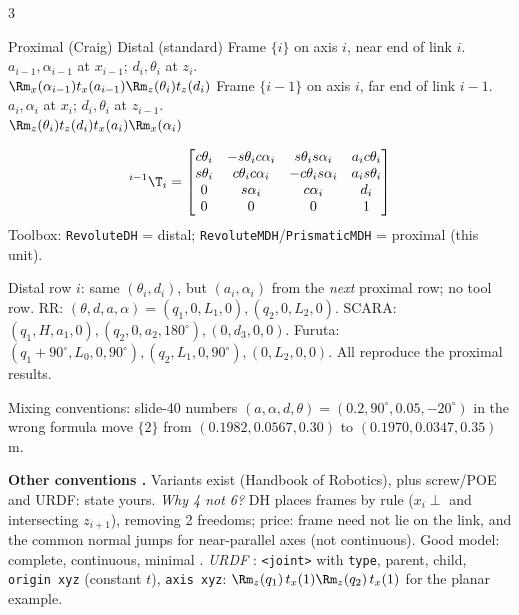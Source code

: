 \begin{multicols}{3}
\begin{twoway}{Proximal (Craig) }{Distal (standard) }
Frame $\{i\}$ on axis $i$, near end of link $i$.\\ $a_{i-1},\alpha_{i-1}$ at $x_{i-1}$; $d_i,\theta_i$ at $z_i$.\\
$\Rm_x(\alpha_{i-1})t_x(a_{i-1})\Rm_z(\theta_i)t_z(d_i)$
\tcblower
Frame $\{i{-}1\}$ on axis $i$, far end of link $i{-}1$.\\ $a_i,\alpha_i$ at $x_i$; $d_i,\theta_i$ at $z_{i-1}$.\\
$\Rm_z(\theta_i)t_z(d_i)t_x(a_i)\Rm_x(\alpha_i)$
\end{twoway}
\begin{fbx}
\[{}^{i-1}\T_i=\begin{bmatrix}c\theta_i&-s\theta_i c\alpha_i&s\theta_i s\alpha_i&a_ic\theta_i\\s\theta_i&c\theta_i c\alpha_i&-c\theta_i s\alpha_i&a_is\theta_i\\0&s\alpha_i&c\alpha_i&d_i\\0&0&0&1\end{bmatrix}\]
Toolbox: \texttt{RevoluteDH} = distal; \texttt{RevoluteMDH}/\texttt{PrismaticMDH} = proximal (this unit).
\end{fbx}
\begin{worked}
Distal row $i$: same $(\theta_i,d_i)$, but $(a_i,\alpha_i)$ from the \emph{next} proximal row; no tool row. RR: $(\theta,d,a,\alpha)=(q_1,0,L_1,0),(q_2,0,L_2,0)$. SCARA: $(q_1,H,a_1,0),(q_2,0,a_2,180^\circ),(0,d_3,0,0)$. Furuta: $(q_1{+}90^\circ,L_0,0,90^\circ),(q_2,L_1,0,90^\circ),(0,L_2,0,0)$. All reproduce the proximal results. \chk
\end{worked}
\begin{trap}
Mixing conventions: slide-40 numbers $(a,\alpha,d,\theta)=(0.2,90^\circ,0.05,-20^\circ)$ in the wrong formula move $\{2\}$ from $(0.1982,0.0567,0.30)$ to $(0.1970,0.0347,0.35)$ m. \chk
\end{trap}
\textbf{Other conventions .} Variants exist (Handbook of Robotics), plus screw/POE and URDF: state yours. \emph{Why 4 not 6?} DH places frames by rule ($x_i\perp$ and intersecting $z_{i+1}$), removing 2 freedoms; price: frame need not lie on the link, and the common normal jumps for near-parallel axes (not continuous). Good model: complete, continuous, minimal . \emph{URDF} : \texttt{<joint>} with \texttt{type}, parent, child, \texttt{origin xyz} (constant $t$), \texttt{axis xyz}: $\Rm_z(q_1)\,t_x(1)\Rm_z(q_2)\,t_x(1)$ for the planar example.


\end{multicols}
